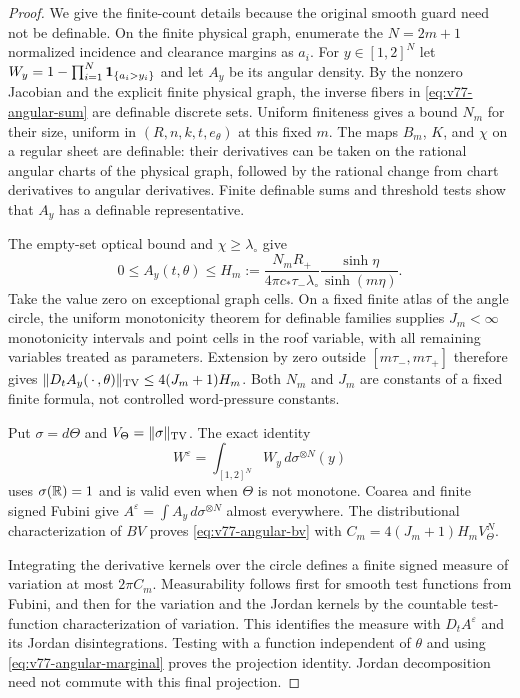 \begin{proof}
We give the finite-count details because the original smooth guard
need not be definable. On the finite physical graph, enumerate the
$N=2m+1$ normalized incidence and clearance margins as $a_i$.
For $y\in[1,2]^N$ let
$W_y=1-\prod_{i=1}^N\mathbf1_{\{a_i>y_i\}}$ and let $A_y$ be its
angular density. By the nonzero Jacobian and the explicit finite
physical graph, the inverse fibers in \eqref{eq:v77-angular-sum}
are definable discrete sets. Uniform finiteness gives a bound $N_m$
for their size, uniform in $(R,n,k,t,e_\theta)$ at this fixed $m$.
The maps $B_m$, $K$, and $\chi$ on a regular sheet are definable:
their derivatives can be taken on the rational angular charts of
the physical graph, followed by the rational change from chart
derivatives to angular derivatives. Finite definable sums and
threshold tests show that $A_y$ has a definable representative.

The empty-set optical bound and $\chi\ge\lambda_\circ$ give
\[
 0\le A_y(t,\theta)\le
 H_m:=\frac{N_m R_+}{4\pi c_*\tau_-\lambda_\circ}
                    \frac{\sinh\eta}{\sinh(m\eta)}.
\]
Take the value zero on exceptional graph cells. On a fixed finite
atlas of the angle circle, the uniform monotonicity theorem for
definable families \cite{Coste} supplies $J_m<\infty$ monotonicity
intervals and point cells in the roof variable, with all remaining
variables treated as parameters. Extension by zero outside
$[m\tau_-,m\tau_+]$ therefore gives
$\|D_tA_y(\,\cdot\,,\theta)\|_{\operatorname{TV}}\le4(J_m+1)H_m$.
Both $N_m$ and $J_m$ are constants of a fixed finite formula, not
controlled word-pressure constants.

Put $\sigma=d\Theta$ and $V_\Theta=\|\sigma\|_{\operatorname{TV}}$.
The exact identity
\[
 W^\varepsilon=\int_{[1,2]^N}W_y\,d\sigma^{\otimes N}(y)
\]
uses $\sigma(\mathbb R)=1$ and is valid even when $\Theta$ is not
monotone. Coarea and finite signed Fubini give
$A^\varepsilon=\int A_y\,d\sigma^{\otimes N}$ almost everywhere.
The distributional characterization of $BV$ \cite{AFP} proves
\eqref{eq:v77-angular-bv} with
$C_m=4(J_m+1)H_m V_\Theta^N$.

Integrating the derivative kernels over the circle defines a finite
signed measure of variation at most $2\pi C_m$. Measurability follows
first for smooth test functions from Fubini, and then for the
variation and the Jordan kernels by the countable test-function
characterization of variation. This identifies the measure with
$D_tA^\varepsilon$ and its Jordan disintegrations. Testing with a
function independent of $\theta$ and using
\eqref{eq:v77-angular-marginal} proves the projection identity.
Jordan decomposition need not commute with this final projection.
\end{proof}

